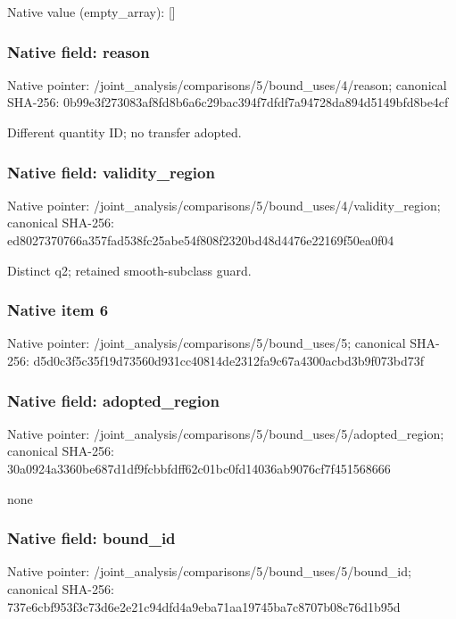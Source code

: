 \documentclass[10pt,a4paper]{article}
\begin{document}
Native value (empty\_\allowbreak{}array): []

\subsubsection{Native field: reason}
Native pointer: /joint\_\allowbreak{}analysis/comparisons/5/bound\_\allowbreak{}uses/4/reason; canonical SHA-256: 0b99e3f273083af8fd8b6a6c29bac394f7dfdf7a94728da894d5149bfd8be4cf

\begingroup\raggedright\sloppy Different quantity ID;\allowbreak{} no transfer adopted.\par\endgroup

\subsubsection{Native field: validity\_\allowbreak{}region}
Native pointer: /joint\_\allowbreak{}analysis/comparisons/5/bound\_\allowbreak{}uses/4/validity\_\allowbreak{}region; canonical SHA-256: ed8027370766a357fad538fc25abe54f808f2320bd48d4476e22169f50ea0f04

\begingroup\raggedright\sloppy Distinct q2;\allowbreak{} retained smooth-subclass guard.\par\endgroup

\subsubsection{Native item 6}
Native pointer: /joint\_\allowbreak{}analysis/comparisons/5/bound\_\allowbreak{}uses/5; canonical SHA-256: d5d0c3f5c35f19d73560d931cc40814de2312fa9c67a4300acbd3b9f073bd73f

\subsubsection{Native field: adopted\_\allowbreak{}region}
Native pointer: /joint\_\allowbreak{}analysis/comparisons/5/bound\_\allowbreak{}uses/5/adopted\_\allowbreak{}region; canonical SHA-256: 30a0924a3360be687d1df9fcbbfdff62c01bc0fd14036ab9076cf7f451568666

\begingroup\raggedright\sloppy none\par\endgroup

\subsubsection{Native field: bound\_\allowbreak{}id}
Native pointer: /joint\_\allowbreak{}analysis/comparisons/5/bound\_\allowbreak{}uses/5/bound\_\allowbreak{}id; canonical SHA-256: 737e6cbf953f3c73d6e2e21c94dfd4a9eba71aa19745ba7c8707b08c76d1b95d
\end{document}
